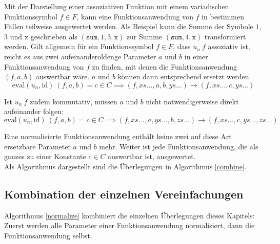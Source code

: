 \documentclass{scrartcl}
\numberwithin{figure}{section} %
\theoremstyle{definition} %
\begin{document}
Mit der Darstellung einer assoziativen Funktion mit einem variadischen Funktionssymbol $f \in F$, kann eine Funktionsanwendung von $f$ in bestimmen Fällen teilweise ausgewertet werden. Als Beispiel kann die Summe der Symbole $1$, $3$ und $\texttt{x}$ geschrieben als $(\texttt{sum}, 1, 3, \texttt{x})$ zur Summe $(\texttt{sum}, 4, \texttt{x})$ transformiert werden. 
Gilt allgemein für ein Funktionssymbol $f \in F$, dass $u_n~f$ assoziativ ist, reicht es aus zwei aufeinanderoldenge Parameter $a$ und $b$ in einer Funktionsanwendung von $f$ zu finden, mit denen die Funktionsanwendung $(f, a, b)$ auswertbar wäre. $a$ und $b$ können dann entsprechend ersetzt werden.
$$\mathrm{eval}(u_n, \mathrm{id})~(f, a, b) = c \in C \implies (f, xs..., a, b, ys...) \rightarrow (f, xs..., c, ys...)$$

Ist $u_n~f$ zudem kommutativ, müssen $a$ und $b$ nicht notwendigerweise direkt aufeinander folgen:
$$\mathrm{eval}(u_n, \mathrm{id})~(f, a, b) = c \in C \implies (f, xs..., a, ys..., b, zs...) \rightarrow (f, xs..., c, ys..., zs...)$$

Eine normalisierte Funktionsanwendung enthält keine zwei auf diese Art ersetzbare Parameter $a$ und $b$ mehr. Weiter ist jede Funktionsanwendung, die als ganzes zu einer Konstante $c \in C$ auswertbar ist, ausgewertet.\\
Als Algorithmus dargestellt sind die Überlegungen in Algorithmus \ref{combine}.

\subsection{Kombination der einzelnen Vereinfachungen}

\begin{algorithm}
\DontPrintSemicolon
\caption{$\mathrm{normalize} \colon T \rightarrow T$}\label{normalize}
\end{algorithm}
Algorithmus \ref{normalize} kombiniert die einzelnen Überlegungen dieses Kapitels: Zuerst werden alle Parameter einer Funktionsanwendung normalisiert, dann die Funktionsanwendung selbst. 
\end{document}
